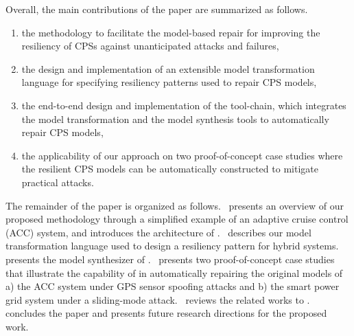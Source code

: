 Overall, the main contributions of the paper are summarized as follows.
%
\begin{enumerate}[leftmargin= 2 em]
\item the methodology to facilitate the model-based repair for improving the resiliency of CPSs against unanticipated attacks and failures,
\item the design and implementation of an extensible model transformation language for specifying resiliency patterns used to repair CPS models,
\item the end-to-end design and implementation of the tool-chain, which integrates the model transformation and the model synthesis tools to automatically repair CPS models,
\item the applicability of our approach on two proof-of-concept case studies where the resilient CPS models can be automatically constructed to mitigate practical attacks.
\end{enumerate}
%
%
%

The remainder of the paper is organized as follows.~ presents an overview of our proposed methodology through a simplified example of an adaptive cruise control (ACC) system, and introduces the architecture of \toolreaffirm.~ describes our model transformation language used to design a resiliency pattern for hybrid systems.~ presents the model synthesizer of \toolreaffirm.~ presents two proof-of-concept case studies that illustrate the capability of \toolreaffirm in automatically repairing the original models of a) the ACC system under GPS sensor spoofing attacks and b) the smart power grid system under a sliding-mode attack.~ reviews the related works to \toolreaffirm.~ concludes the paper and presents future research directions for the proposed work.





